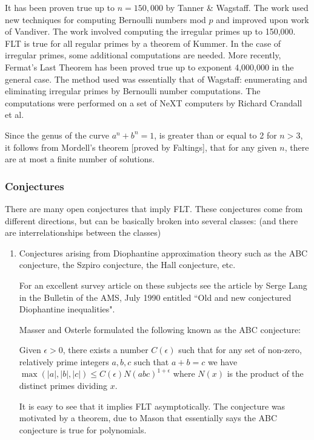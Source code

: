 {    It has been proven true up to $n = 150,000$ by Tanner \& Wagstaff. The
    work used new techniques for computing Bernoulli numbers mod $p$ and
    improved upon work of Vandiver. The work involved computing the
    irregular primes up to 150,000. FLT is true for all regular primes
    by a theorem of Kummer. In the case of irregular primes, some
    additional computations are needed. More recently, 
    Fermat's Last Theorem has been proved true up to exponent 4,000,000
    in the general case. The method used was essentially that of Wagstaff:
    enumerating and eliminating irregular primes by Bernoulli number
    computations. The computations were performed on a set of NeXT
    computers by Richard Crandall et al.

    Since the genus of the curve $a^n + b^n = 1$, is greater than or equal
    to 2 for $n > 3$, it follows from Mordell's theorem [proved by
    Faltings], that for any given $n$, there are at most a finite number
    of solutions.


    \subsubsection{Conjectures}

    There are many open conjectures that imply FLT. These conjectures
    come from different directions, but can be basically broken into
    several classes: (and there are interrelationships between the
    classes)
\begin{enumerate}

    \item Conjectures arising from Diophantine approximation theory such
    as the ABC conjecture, the Szpiro conjecture, the Hall conjecture,
    etc.

    For an excellent survey article on these subjects see the article
    by Serge Lang in the Bulletin of the AMS, July 1990 entitled
    ``Old and new conjectured Diophantine inequalities".

    Masser and Osterle formulated the following known as the ABC
    conjecture:

    Given $\epsilon > 0$, there exists a number $C(\epsilon)$ such that for
    any set of non-zero, relatively prime integers $a,b,c$ such that
    $a+b = c$ we have
    $\max( |a|, |b|, |c|) \leq C(\epsilon) N(abc)^{1 + \epsilon}$
    where $N(x)$ is the product of the distinct primes dividing $x$.

    It is easy to see that it implies FLT asymptotically. The conjecture
    was motivated by a theorem, due to Mason that essentially says the
    ABC conjecture is true for polynomials.


\end{enumerate}}

